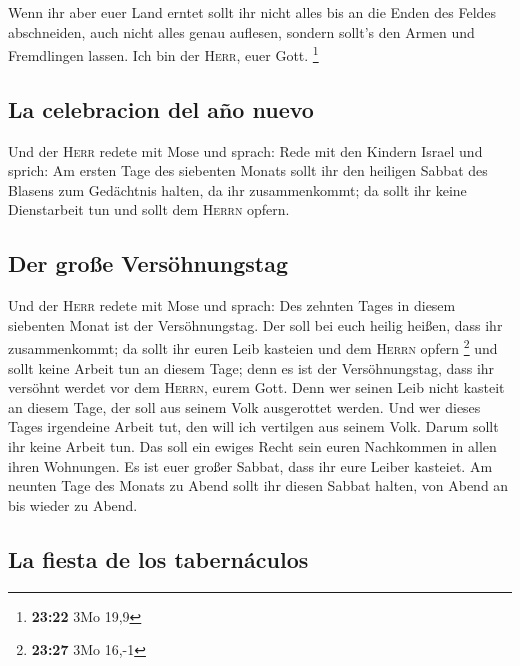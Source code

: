  Wenn ihr aber euer Land erntet sollt ihr nicht alles bis
an die Enden des Feldes abschneiden, auch nicht alles genau auflesen,
sondern sollt's den Armen und Fremdlingen lassen. Ich bin der
\textsc{Herr}, euer Gott. \footnote{\textbf{23:22} 3Mo 19,9}

\hypertarget{la-celebracion-del-auxf1o-nuevo}{%
\subsection{La celebracion del año
nuevo}\label{la-celebracion-del-auxf1o-nuevo}}

 Und der \textsc{Herr} redete mit Mose und sprach:
 Rede mit den Kindern Israel und sprich: Am ersten Tage
des siebenten Monats sollt ihr den heiligen Sabbat des Blasens zum
Gedächtnis halten, da ihr zusammenkommt;  da sollt ihr
keine Dienstarbeit tun und sollt dem \textsc{Herrn} opfern.

\hypertarget{der-grouxdfe-versuxf6hnungstag}{%
\subsection{Der große
Versöhnungstag}\label{der-grouxdfe-versuxf6hnungstag}}

 Und der \textsc{Herr} redete mit Mose und sprach:
 Des zehnten Tages in diesem siebenten Monat ist der
Versöhnungstag. Der soll bei euch heilig heißen, dass ihr zusammenkommt;
da sollt ihr euren Leib kasteien und dem \textsc{Herrn} opfern
\footnote{\textbf{23:27} 3Mo 16,-1}  und sollt keine
Arbeit tun an diesem Tage; denn es ist der Versöhnungstag, dass ihr
versöhnt werdet vor dem \textsc{Herrn}, eurem Gott.  Denn
wer seinen Leib nicht kasteit an diesem Tage, der soll aus seinem Volk
ausgerottet werden.  Und wer dieses Tages irgendeine
Arbeit tut, den will ich vertilgen aus seinem Volk. 
Darum sollt ihr keine Arbeit tun. Das soll ein ewiges Recht sein euren
Nachkommen in allen ihren Wohnungen.  Es ist euer großer
Sabbat, dass ihr eure Leiber kasteiet. Am neunten Tage des Monats zu
Abend sollt ihr diesen Sabbat halten, von Abend an bis wieder zu Abend.

\hypertarget{la-fiesta-de-los-tabernuxe1culos}{%
\subsection{La fiesta de los
tabernáculos}\label{la-fiesta-de-los-tabernuxe1culos}}

